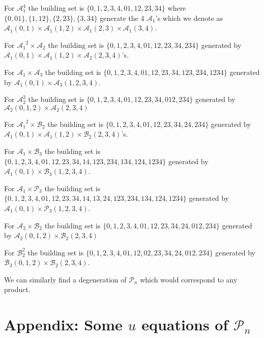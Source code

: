 \documentclass[hidelinks,12pt]{article}
\begin{document}
For ${\mathscr A_1^{4}}$ the building set is $ \{ {0},{1},{2},{3},{4},{01},{12},{23},{34} \}$ where $\{0,01\} , \{1,12\},\{2,23\},\{3,34\}$ generate the 4 ${\mathscr A_1}$'s which we denote as ${\mathscr A_1}(0,1) \times {\mathscr A_1}(1,2) \times {\mathscr A_1}(2,3) \times {\mathscr A_1}(3,4) $.

For ${\mathscr A_1}^{2} \times {\mathscr A_2}$ the building set is $ \{ {0},{1},{2},{3},{4},{01},{12},{23},{34},{234} \}$ generated by ${\mathscr A_1}(0,1)\times {\mathscr A_1}(1,2) \times {\mathscr A_2}(2,3,4)$'s.

For  ${\mathscr A_1} \times {\mathscr A_3}$ the building set is $ \{ {0},{1},{2},{3},{4},{01},{12},{23},{34},{123},{234},{1234} \}$ generated by  ${\mathscr A_1}(0,1)\times {\mathscr A_3}(1,2,3,4)$.

For  ${\mathscr A_2^{2}}$ the building set is $ \{ {0},{1},{2},{3},{4},{01},{12},{23},{34} ,{012},{234}\}$ generated by ${\mathscr A_2}(0,1,2)\times {\mathscr A_2}(2,3,4)$

For ${\mathscr A_1}^{2} \times {\mathscr B_2}$ the building set is $ \{ {0},{1},{2},{3},{4},{01},{12},{23},{34},{24},{234} \}$ generated by ${\mathscr A_1}(0,1)\times {\mathscr A_1}(1,2) \times {\mathscr B_2}(2,3,4)$'s.

For ${\mathscr A_1} \times {\mathscr B_3}$ the building set is $ \{ {0},{1},{2},{3},{4},{01},{12},{23},{34},{14},{123},{234},{134},{124},{1234} \}$ generated by  ${\mathscr A_1}(0,1)\times {\mathscr B_3}(1,2,3,4)$.

For ${\mathscr A_1} \times {\mathscr P_3}$ the building set is $ \{ {0},{1},{2},{3},{4},{01},{12},{23},{34},{14},{13},{24},{123},{234},{134},{124},{1234} \}$ generated by  ${\mathscr A_1}(0,1)\times {\mathscr P_3}(1,2,3,4)$.

For ${\mathscr A_2} \times {\mathscr B_2}$ the building set is $ \{ {0},{1},{2},{3},{4},{01},{12},{23},{34},{24},{012},{234}\}$ generated by ${\mathscr A_2}(0,1,2)\times {\mathscr B_2}(2,3,4)$

For ${\mathscr B_2^{2}}$ the building set is $ \{ {0},{1},{2},{3},{4},{01},{12},{02},{23},{34},{24} ,{012},{234}\}$ generated by ${\mathscr B_2}(0,1,2)\times {\mathscr B_2}(2,3,4)$.

We can similarly find a degeneration of ${\mathscr P_n}$ which would correspond to any product.

\section{Appendix: Some $u$ equations of ${\mathscr P_n}$}\label{appendix:B}
\end{document}
